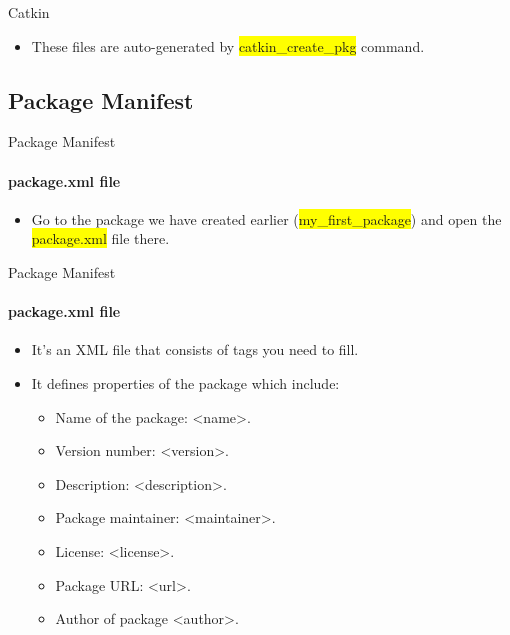 \documentclass{beamer}
\begin{document}
\begin{frame}{Catkin}
    
    \begin{itemize}
        \item These files are auto-generated by {\ttfamily \colorbox{yellow}{catkin\_create\_pkg}}  command.
    \end{itemize}

    
\end{frame}


\subsection{Package Manifest}

\begin{frame}{Package Manifest}
    \framesubtitle{package.xml file}
    
    \begin{itemize}
        \item Go to the package we have created earlier ({\ttfamily \colorbox{yellow}{my\_first\_package}}) and open the {\ttfamily \colorbox{yellow}{package.xml}} file there.
    \end{itemize}
   \end{frame} 
   
    
   \begin{frame}{Package Manifest}
       \framesubtitle{package.xml file}
   
        \begin{itemize}
            \item It's an XML file that consists of tags you need to fill.
            
            \item It defines properties of the package which include:
            \begin{itemize}
                \item Name of the package: {\color{red}<name>}.
                \item Version number: {\color{red}<version>}.
                \item Description: {\color{red}<description>}.
                \item Package maintainer: {\color{red}<maintainer>}.
                \item License: {\color{red}<license>}.
                \item Package URL: {\color{red}<url>}.
                \item Author of package {\color{red}<author>}.
            \end{itemize}
        \end{itemize}
    
\end{frame}
\end{document}
